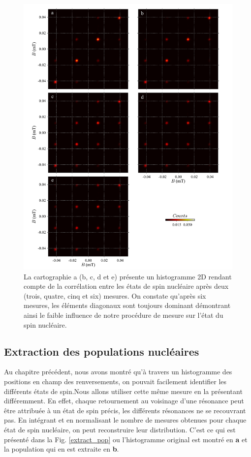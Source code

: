 \begin{figure}
\includegraphics[scale=0.45]{Resultats/MesureInfl/MesureInfl.pdf} 
\caption{La cartographie a (b, c, d et e) présente un histogramme 2D rendant compte de la corrélation entre les états de spin nucléaire après deux (trois, quatre, cinq et six) mesures. On constate qu'après six mesures, les éléments diagonaux sont toujours dominant démontrant ainsi le faible influence de notre procédure de mesure sur l'état du spin nucléaire.}
\label{evolution_mesures}
\end{figure}

\subsection{Extraction des populations nucléaires}
Au chapitre précédent, nous avons montré qu'à travers un histogramme des positions en champ des renversements, on pouvait facilement identifier les différents états de spin.Nous allons utiliser cette m\^eme mesure en la présentant différemment. En effet, chaque retournement au voisinage d'une résonance peut \^etre attribuée à un état de spin précis, les différents résonances ne se recouvrant pas. En intégrant et en normalisant le nombre de mesures obtenues pour chaque état de spin nucléaire, on peut reconstruire leur distribution. C'est ce qui est présenté dans la Fig. \ref{extract_pop} ou l'histogramme original est montré en \textbf{a} et la population qui en est extraite en \textbf{b}.

